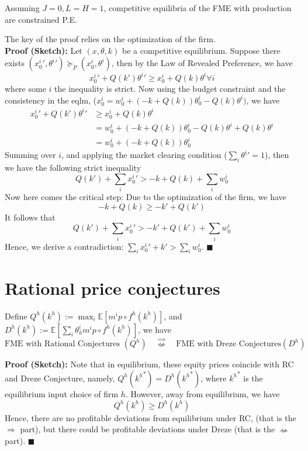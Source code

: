 \clearpage 
\begin{tcolorbox}
    \begin{proposition}
        Assuming $J = 0, L = H = 1$, competitive equilibria of the FME with production are constrained P.E.
    \end{proposition}
\end{tcolorbox}
The key of the proof relies on the optimization of the firm.
\\
\noindent \textbf{Proof (Sketch):}
Let $(x, \theta, k)$ be a competitive equilibrium. 
Suppose there exists $({x^i_0}', {\theta^i}') \succeq_{P} ({x^i_0}, {\theta^i})$, then by 
the Law of Revealed Preference, we have 
\[
{x^i_0}' + Q(k') {\theta^i}' \geq {x^i_0} + Q(k) {\theta^i} \forall i
\]
where some $i$ the inequality is strict. 
Now using the budget constraint and the consistency in the eqlm,  
($x^i_0 = w^i_0 + ( -k + Q(k))\theta^i_0 - Q(k) \theta^i )$, we have 
\begin{align*}
{x^i_0}' + Q(k') {\theta^i}' & \geq {x^i_0} + Q(k) {\theta^i}  \\ 
& =  w^i_0 + ( -k + Q(k))\theta^i_0 - Q(k) \theta^i + Q(k) {\theta^i}  \\ 
& =  w^i_0 + ( -k + Q(k))\theta^i_0  
\end{align*}
Summing over $i$, and applying the market clearing condition ($\sum_i {\theta^i}' = 1$), then we have 
the following strict inequality
\[
Q(k') + \sum_i {x^i_0}' >  -k + Q(k) + \sum_i w^i_0 
\]
Now here comes the critical step:
Due to the optimization of the firm, we have
\[
-k + Q(k) \geq -k' + Q(k')
\]
It follows that 
\[
Q(k') + \sum_i {x^i_0}' >  -k' + Q(k') + \sum_i w^i_0 
\]
Hence, we derive a contradiction:
$\sum_i {x^i_0}' + k' > \sum_i w^i_0$. \(\blacksquare\)






\clearpage
\section{Rational price conjectures}


\begin{tcolorbox}
\begin{proposition}
Define $Q^h(k^h) := \max_i \mathbb{E}[m^i p \circ f^h(k^h)]$, and 
$D^h(k^h) := \mathbb{E}[\sum_i \theta^i_h m^i p \circ f^h(k^h)]$, we have
\[
\text{FME with Rational Conjectures } (Q^h) \quad \overset{\Rightarrow}{\nLeftarrow} \quad \text{FME with Dreze Conjectures} (D^h)
\]
\end{proposition}
\noindent \textbf{Proof (Sketch):} Note that in equilibrium, 
these equity prices coincide with RC and Dreze Conjecture, namely, $Q^h({k^h}^*) = D^h({k^h}^*)$,
where ${k^h}^*$ is the equilibrium input choice of firm $h$.
However, away from equilibrium, we have 
\[
Q^h(k^h) \geq D^h(k^h)
\]
Hence, there are no profitable deviations from equilibrium under RC, (that is the $\Rightarrow$ part),
but there could be profitable deviations under Dreze (that is the $\nLeftarrow$ part).
\(\blacksquare\)    
\end{tcolorbox}



